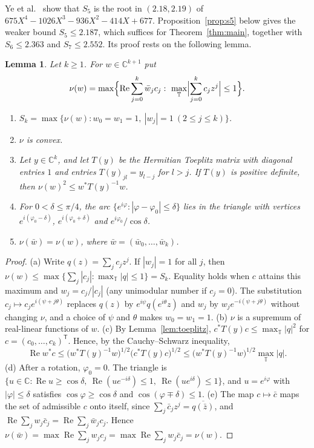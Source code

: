 \documentclass[11pt]{amsart}
\newtheorem{lemma}[theorem]{Lemma}
\theoremstyle{remark}
\numberwithin{equation}{section}
\newcommand{\C}{\mathbb{C}}
\newcommand{\T}{\mathbb{T}}
\newcommand{\FiveOwn}{2.187}
\newcommand{\SixOwn}{2.363}
\newcommand{\SevenOwn}{2.552}
\begin{document}
Ye et al.\ \cite[Theorem~1.1]{Ye26} show that $S_5$ is the root in $(2.18,2.19)$ of $675X^4-1026X^3-936X^2-414X+677$. Proposition~\ref{prop:s5} below gives the weaker bound $S_5\le\FiveOwn$, which suffices for Theorem~\ref{thm:main}, together with $S_6\le\SixOwn$ and $S_7\le\SevenOwn$. Its proof rests on the following lemma.

\begin{lemma}\label{lem:dual}
Let $k\ge1$. For $w\in\C^{k+1}$ put
\[
\nu(w)=\max\Bigl\{\operatorname{Re}\sum_{j=0}^k\bar w_jc_j:\ \max_\T\Bigl|\sum_{j=0}^kc_jz^j\Bigr|\le1\Bigr\}.
\]
\begin{enumerate}[label=\textup{(\alph*)}]
\item $S_k=\max\{\nu(w):w_0=w_1=1,\ |w_j|=1\ (2\le j\le k)\}$.
\item $\nu$ is convex.
\item Let $y\in\C^k$, and let $T(y)$ be the Hermitian Toeplitz matrix with diagonal entries $1$ and entries $T(y)_{jl}=y_{l-j}$ for $l>j$. If $T(y)$ is positive definite, then $\nu(w)^2\le w^*T(y)^{-1}w$.
\item For $0<\delta\le\pi/4$, the arc $\{e^{i\varphi}:|\varphi-\varphi_0|\le\delta\}$ lies in the triangle with vertices $e^{i(\varphi_0-\delta)}$, $e^{i(\varphi_0+\delta)}$ and $e^{i\varphi_0}/\cos\delta$.
\item $\nu(\bar w)=\nu(w)$, where $\bar w=(\bar w_0,\dots,\bar w_k)$.
\end{enumerate}
\end{lemma}

\begin{proof}
(a) Write $q(z)=\sum_jc_jz^j$. If $|w_j|=1$ for all $j$, then $\nu(w)\le\max\{\sum_j|c_j|:\max_\T|q|\le1\}=S_k$. Equality holds when $c$ attains this maximum and $w_j=c_j/|c_j|$ (any unimodular number if $c_j=0$). The substitution $c_j\mapsto c_je^{i(\psi+j\theta)}$ replaces $q(z)$ by $e^{i\psi}q(e^{i\theta}z)$ and $w_j$ by $w_je^{-i(\psi+j\theta)}$ without changing $\nu$, and a choice of $\psi$ and $\theta$ makes $w_0=w_1=1$.
(b) $\nu$ is a supremum of real-linear functions of $w$.
(c) By Lemma~\ref{lem:toeplitz}, $c^*T(y)c\le\max_\T|q|^2$ for $c=(c_0,\dots,c_k)^{\mathsf T}$. Hence, by the Cauchy--Schwarz inequality,
\[
\operatorname{Re}w^*c\le\bigl(w^*T(y)^{-1}w\bigr)^{1/2}\bigl(c^*T(y)c\bigr)^{1/2}\le\bigl(w^*T(y)^{-1}w\bigr)^{1/2}\max_\T|q|.
\]
(d) After a rotation, $\varphi_0=0$. The triangle is $\{u\in\C:\operatorname{Re}u\ge\cos\delta,\ \operatorname{Re}(ue^{-i\delta})\le1,\ \operatorname{Re}(ue^{i\delta})\le1\}$, and $u=e^{i\varphi}$ with $|\varphi|\le\delta$ satisfies $\cos\varphi\ge\cos\delta$ and $\cos(\varphi\mp\delta)\le1$.
(e) The map $c\mapsto\bar c$ maps the set of admissible $c$ onto itself, since $\sum_j\bar c_jz^j=\overline{q(\bar z)}$, and $\operatorname{Re}\sum_jw_j\bar c_j=\operatorname{Re}\sum_j\bar w_jc_j$. Hence $\nu(\bar w)=\max\operatorname{Re}\sum_jw_jc_j=\max\operatorname{Re}\sum_jw_j\bar c_j=\nu(w)$.
\end{proof}
\end{document}
